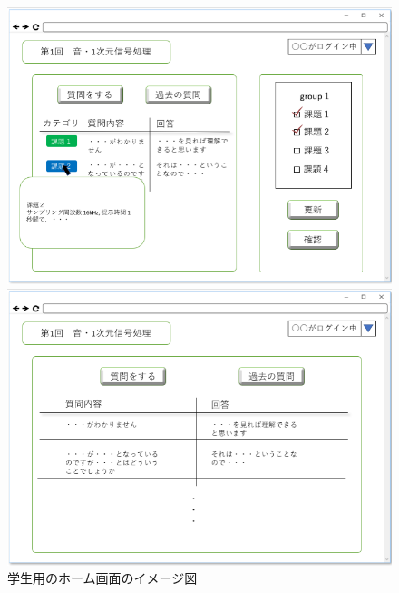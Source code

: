 \begin{figure}[htbp]
 \begin{minipage}{0.5\hsize}
  \begin{center}
   \includegraphics[width=1\linewidth,clip]{./img/28.png}
  \end{center}

 \end{minipage}
 \begin{minipage}{0.5\hsize}
  \begin{center}
   \includegraphics[width=1\linewidth,clip]{./img/29.png}
  \end{center}
 \end{minipage}
 \caption{学生用のホーム画面のイメージ図}\label{fig:28}
\end{figure}

